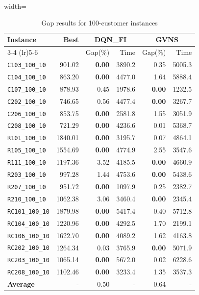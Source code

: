 \begin{table}[ht]
\centering
\small
\setlength{\tabcolsep}{5pt}
\caption{Gap results for 100-customer instances}
\vspace{4mm}
\begin{adjustbox}{width=\textwidth}
\begin{tabular}{l r r r @{\hspace{8pt}} r r @{\hspace{8pt}}}
\toprule
\multirow{2}{*}{Instance} & \multirow{2}{*}{Best} & \multicolumn{2}{c}{DQN\_FI} & \multicolumn{2}{c}{GVNS} \\
\cmidrule(lr){3-4} \cmidrule(lr){5-6}
 &  & Gap(\%) & Time & Gap(\%) & Time \\
\midrule
\texttt{C103\_100\_10} & 901.02 & \textbf{0.00} & 3890.2 & 0.35 & 5005.3 \\
\texttt{C104\_100\_10} & 863.20 & \textbf{0.00} & 4477.0 & 1.64 & 5888.4 \\
\texttt{C107\_100\_10} & 878.93 & 0.45 & 1978.6 & \textbf{0.00} & 1232.5 \\
\texttt{C202\_100\_10} & 746.65 & 0.56 & 4477.4 & \textbf{0.00} & 3267.7 \\
\texttt{C206\_100\_10} & 853.75 & \textbf{0.00} & 2581.8 & 1.55 & 3051.9 \\
\texttt{C208\_100\_10} & 721.29 & \textbf{0.00} & 4236.6 & 0.01 & 5368.7 \\
\texttt{R101\_100\_10} & 1840.01 & \textbf{0.00} & 3195.7 & 0.07 & 4864.1 \\
\texttt{R105\_100\_10} & 1554.69 & \textbf{0.00} & 4774.9 & 2.55 & 3547.6 \\
\texttt{R111\_100\_10} & 1197.36 & 3.52 & 4185.5 & \textbf{0.00} & 4660.9 \\
\texttt{R203\_100\_10} & 997.28 & 1.44 & 4753.6 & \textbf{0.00} & 5438.6 \\
\texttt{R207\_100\_10} & 951.72 & \textbf{0.00} & 1097.9 & 0.25 & 2382.7 \\
\texttt{R210\_100\_10} & 1062.38 & 3.06 & 3460.4 & \textbf{0.00} & 2345.4 \\
\texttt{RC101\_100\_10} & 1879.98 & \textbf{0.00} & 5417.4 & 0.40 & 5712.8 \\
\texttt{RC104\_100\_10} & 1220.96 & \textbf{0.00} & 4292.5 & 1.70 & 2199.1 \\
\texttt{RC106\_100\_10} & 1622.70 & \textbf{0.00} & 4089.2 & 1.62 & 4163.8 \\
\texttt{RC202\_100\_10} & 1264.34 & 0.03 & 3765.9 & \textbf{0.00} & 5071.9 \\
\texttt{RC203\_100\_10} & 1065.14 & \textbf{0.00} & 5672.0 & 0.02 & 6228.6 \\
\texttt{RC208\_100\_10} & 1102.46 & \textbf{0.00} & 3233.4 & 1.35 & 3537.3 \\
\midrule
\textbf{Average} & - & 0.50 & - & 0.64 & - \\
\bottomrule
\end{tabular}
\end{adjustbox}
\end{table}